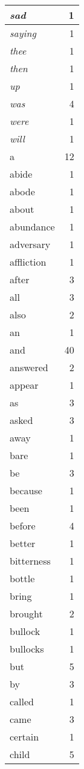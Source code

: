 \begin{center}
\begin{longtable}{l|r}
\emph{sad} & 1 \\ \hline
\emph{saying} & 1 \\ \hline
\emph{thee} & 1 \\ \hline
\emph{then} & 1 \\ \hline
\emph{up} & 1 \\ \hline
\emph{was} & 4 \\ \hline
\emph{were} & 1 \\ \hline
\emph{will} & 1 \\ \hline
a & 12 \\ \hline
abide & 1 \\ \hline
abode & 1 \\ \hline
about & 1 \\ \hline
abundance & 1 \\ \hline
adversary & 1 \\ \hline
affliction & 1 \\ \hline
after & 3 \\ \hline
all & 3 \\ \hline
also & 2 \\ \hline
an & 1 \\ \hline
and & 40 \\ \hline
answered & 2 \\ \hline
appear & 1 \\ \hline
as & 3 \\ \hline
asked & 3 \\ \hline
away & 1 \\ \hline
bare & 1 \\ \hline
be & 3 \\ \hline
because & 1 \\ \hline
been & 1 \\ \hline
before & 4 \\ \hline
better & 1 \\ \hline
bitterness & 1 \\ \hline
bottle & 1 \\ \hline
bring & 1 \\ \hline
brought & 2 \\ \hline
bullock & 1 \\ \hline
bullocks & 1 \\ \hline
but & 5 \\ \hline
by & 3 \\ \hline
called & 1 \\ \hline
came & 3 \\ \hline
certain & 1 \\ \hline
child & 5 \\ \hline

\end{longtable}
\end{center}
